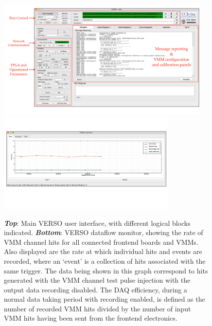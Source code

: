 \begin{figure}[!htb]
    \begin{center}
        \includegraphics[width=0.95\textwidth]{figures/nsw/vrs/verso_mainPDF}
        \includegraphics[width=0.8\textwidth]{figures/nsw/vrs/verso_dataflow}
        \caption{
            \textbf{\textit{Top}}: Main VERSO user interface, with different logical blocks indicated.
            \textbf{\textit{Bottom}}: VERSO dataflow monitor, showing the rate of VMM channel hits
                for all connected frontend boards and VMMs. Also displayed are the rate at which individual
                hits and events are recorded, where an `event' is a collection of hits associated with the
                same trigger.
                The data being shown in this graph correspond to hits generated with the VMM channel
                test pulse injection with the output data recording disabled.
                The DAQ efficiency, during a normal data taking period with recording enabled, is defined
                as the number of recorded VMM hits divided by the number of input VMM hits having been
                sent from the frontend electronics.
        }
        \label{fig:verso_main}
    \end{center}
\end{figure}

